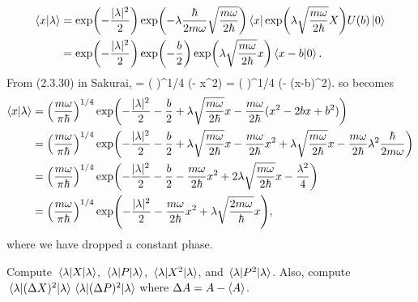 \begin{solution}
	\begin{align}
		\braket{x}{\lambda} &= \exp(-\frac{|\lambda|^2}{2}) \exp(-\lambda \frac{\hbar}{2 m \omega} \sqrt{\frac{m\omega}{2\hbar}}) \bra{x} \exp(\lambda \sqrt{\frac{m\omega}{2\hbar}} X) U(b) \ket{0} \notag \\
		&= \exp(-\frac{|\lambda|^2}{2}) \exp(-\frac{b}{2}) \exp(\lambda \sqrt{\frac{m\omega}{2\hbar}} x) \braket{x-b}{0}. \label{ugh2}
	\end{align}
	From (2.3.30) in Sakurai,
	\beq
		\bkxo = \left(  \right)^{1/4} \exp(- x^2)
		\implies
		\bkxbo = \left(  \right)^{1/4} \exp(- (x-b)^2).
	\eeq
	so  becomes
	\begin{align}
		\braket{x}{\lambda} &= \left( \frac{m \omega}{\pi \hbar} \right)^{1/4} \exp(-\frac{|\lambda|^2}{2} -\frac{b}{2} + \lambda \sqrt{\frac{m\omega}{2\hbar}} x - \frac{m \omega}{2 \hbar} (x^2 - 2bx + b^2)) \notag \\
		&= \left( \frac{m \omega}{\pi \hbar} \right)^{1/4} \exp(-\frac{|\lambda|^2}{2} -\frac{b}{2} + \lambda \sqrt{\frac{m\omega}{2\hbar}} x - \frac{m \omega}{2 \hbar} x^2 + \lambda \sqrt{\frac{m \omega}{2 \hbar}} x - \frac{m \omega}{2 \hbar} \lambda^2 \frac{\hbar}{2 m \omega}) \notag \\
		&= \left( \frac{m \omega}{\pi \hbar} \right)^{1/4} \exp(-\frac{|\lambda|^2}{2} - \frac{b}{2} - \frac{m \omega}{2 \hbar} x^2 + 2 \lambda \sqrt{\frac{m \omega}{2 \hbar}} x - \frac{\lambda^2}{4}) \notag \\
		&= \left( \frac{m \omega}{\pi \hbar} \right)^{1/4} \exp(-\frac{|\lambda|^2}{2} - \frac{m \omega}{2 \hbar} x^2 + \lambda \sqrt{\frac{2 m \omega}{\hbar}} x), \label{wfnlam}
	\end{align}
	where we have dropped a constant phase.
\end{solution}

\begin{problem}
	Compute $\ev{X}{\lam}$, $\ev{P}{\lam}$, $\ev{X^2}{\lam}$, and $\ev{P^2}{\lam}$.  Also, compute $\ev{(\DX)^2}{\lam} \ev{(\DP)^2}{\lam}$ where $\DA = A - \ev{A}$.
\end{problem}

